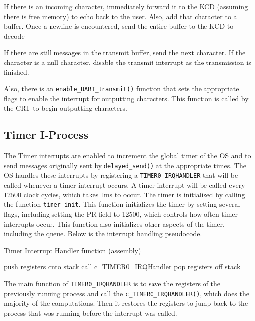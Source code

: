 \documentclass[12pt]{report}
\begin{document}
If there is an incoming character, immediately forward it to the KCD (assuming there is free memory) to echo back to the user. Also, add that character to a buffer. Once a newline is encountered, send the entire buffer to the KCD to decode

If there are still messages in the transmit buffer, send the next character. If the character is a null character, disable the transmit interrupt as the transmission is finished.


Also, there is an \texttt{enable_UART_transmit()} function that sets the appropriate flags to enable the interrupt for outputting characters. This function is called by the CRT to begin outputting characters.


\subsection{Timer I-Process}

The Timer interrupts are enabled to increment the global timer of the OS and to send messages originally sent by \texttt{delayed_send()} at the appropriate times.  The OS handles these interrupts by registering a \texttt{TIMER0_IRQHANDLER} that will be called whenever a timer interrupt occurs.  A timer interrupt will be called every 12500 clock cycles, which takes 1ms to occur.
The timer is initialized by calling the function \texttt{timer\_init}.  This function initializes the timer by setting several flags, including setting the PR field to 12500, which controls how often timer interrupts occur.  This function also initializes other aspects of the timer, including the queue.  Below is the interrupt handling pseudocode.

\begin{algorithm}[H]
	\caption{Timer Interrupt Handler function (assembly)}
	\begin{algorithmic}[1]
	    \State push registers onto stack
	    \State call c_TIMER0\_IRQHandler
	    \State pop registers off stack
	  \EndFunction
	\end{algorithmic}
\end{algorithm}

The main function of \texttt{TIMER0_IRQHANDLER} is to save the registers of the previously running process and call the \texttt{c_TIMER0_IRQHANDLER()}, which does the majority of the computations.  Then it restores the registers to jump back to the process that was running before the interrupt was called.
\end{document}
